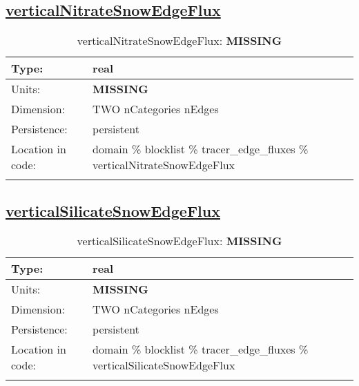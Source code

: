 \subsection[verticalNitrateSnowEdgeFlux]{\hyperref[sec:var_tab_tracer_edge_fluxes]{verticalNitrateSnowEdgeFlux}}
\label{subsec:var_sec_tracer_edge_fluxes_verticalNitrateSnowEdgeFlux}
\begin{center}
\begin{longtable}{| p{2.0in} | p{4.0in} |}
        \hline 
        Type: & real \\
        \hline 
        Units: & {\bf \color{red} MISSING} \\
        \hline 
        Dimension: & TWO nCategories nEdges \\
        \hline 
        Persistence: & persistent \\
        \hline 
         Location in code: & domain \% blocklist \% tracer\_edge\_fluxes \% verticalNitrateSnowEdgeFlux \\
         \hline 
    \caption{verticalNitrateSnowEdgeFlux: {\bf \color{red} MISSING}}
\end{longtable}
\end{center}
\subsection[verticalSilicateSnowEdgeFlux]{\hyperref[sec:var_tab_tracer_edge_fluxes]{verticalSilicateSnowEdgeFlux}}
\label{subsec:var_sec_tracer_edge_fluxes_verticalSilicateSnowEdgeFlux}
\begin{center}
\begin{longtable}{| p{2.0in} | p{4.0in} |}
        \hline 
        Type: & real \\
        \hline 
        Units: & {\bf \color{red} MISSING} \\
        \hline 
        Dimension: & TWO nCategories nEdges \\
        \hline 
        Persistence: & persistent \\
        \hline 
         Location in code: & domain \% blocklist \% tracer\_edge\_fluxes \% verticalSilicateSnowEdgeFlux \\
         \hline 
    \caption{verticalSilicateSnowEdgeFlux: {\bf \color{red} MISSING}}
\end{longtable}
\end{center}
